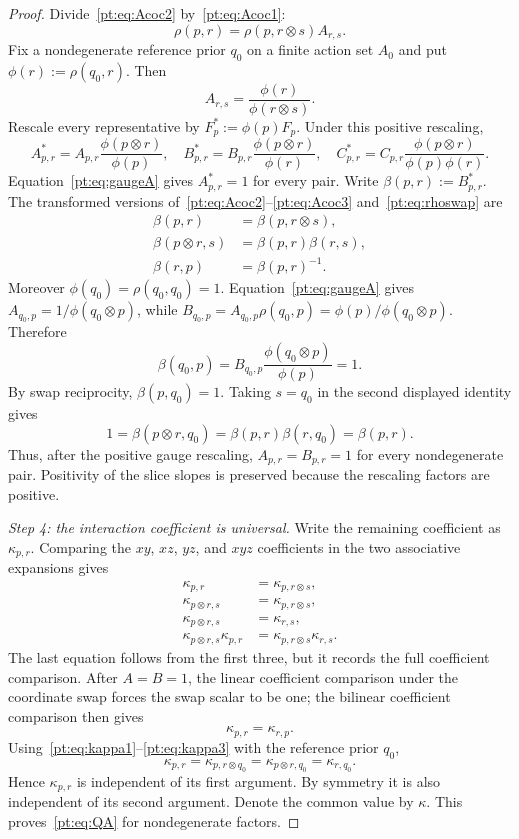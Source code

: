 \documentclass[11pt,a4paper]{article}
\theoremstyle{definition}
\newcommand{\1}{\mathbf 1}
\begin{document}
\begin{proof}
Divide~\eqref{pt:eq:Acoc2} by~\eqref{pt:eq:Acoc1}:
\[
\rho(p,r)=\rho(p,r\otimes s)A_{r,s}.
\]
Fix a nondegenerate reference prior $q_0$ on a finite action set $A_0$ and put $\phi(r):=\rho(q_0,r)$.  Then
\begin{equation}
A_{r,s}=\frac{\phi(r)}{\phi(r\otimes s)}.
\tag{G}\label{pt:eq:gaugeA}
\end{equation}
Rescale every representative by $F_p^*:=\phi(p)F_p$.  Under this positive rescaling,
\[
A^*_{p,r}=A_{p,r}\frac{\phi(p\otimes r)}{\phi(p)},
\quad
B^*_{p,r}=B_{p,r}\frac{\phi(p\otimes r)}{\phi(r)},
\quad
C^*_{p,r}=C_{p,r}\frac{\phi(p\otimes r)}{\phi(p)\phi(r)}.
\]
Equation~\eqref{pt:eq:gaugeA} gives $A^*_{p,r}=1$ for every pair.  Write $\beta(p,r):=B^*_{p,r}$.  The transformed
versions of~\eqref{pt:eq:Acoc2}--\eqref{pt:eq:Acoc3} and~\eqref{pt:eq:rhoswap} are
\begin{align*}
\beta(p,r)&=\beta(p,r\otimes s),\\
\beta(p\otimes r,s)&=\beta(p,r)\beta(r,s),\\
\beta(r,p)&=\beta(p,r)^{-1}.
\end{align*}
Moreover $\phi(q_0)=\rho(q_0,q_0)=1$.  Equation~\eqref{pt:eq:gaugeA} gives
$A_{q_0,p}=1/\phi(q_0\otimes p)$, while
$B_{q_0,p}=A_{q_0,p}\rho(q_0,p)=\phi(p)/\phi(q_0\otimes p)$.  Therefore
\[
\beta(q_0,p)=B_{q_0,p}\frac{\phi(q_0\otimes p)}{\phi(p)}=1.
\]
By swap reciprocity, $\beta(p,q_0)=1$.  Taking $s=q_0$ in the second displayed identity gives
\[
1=\beta(p\otimes r,q_0)=\beta(p,r)\beta(r,q_0)=\beta(p,r).
\]
Thus, after the positive gauge rescaling, $A_{p,r}=B_{p,r}=1$ for every nondegenerate pair.  Positivity of the slice
slopes is preserved because the rescaling factors are positive.

\emph{Step 4: the interaction coefficient is universal.}
Write the remaining coefficient as $\kappa_{p,r}$.  Comparing the $xy$, $xz$, $yz$, and $xyz$ coefficients in the two
associative expansions gives
\begin{align}
\kappa_{p,r}&=\kappa_{p,r\otimes s}, \tag{K1}\label{pt:eq:kappa1}\\
\kappa_{p\otimes r,s}&=\kappa_{p,r\otimes s}, \tag{K2}\label{pt:eq:kappa2}\\
\kappa_{p\otimes r,s}&=\kappa_{r,s}, \tag{K3}\label{pt:eq:kappa3}\\
\kappa_{p\otimes r,s}\kappa_{p,r}&=\kappa_{p,r\otimes s}\kappa_{r,s}. \tag{K4}\label{pt:eq:kappa4}
\end{align}
The last equation follows from the first three, but it records the full coefficient comparison.  After $A=B=1$, the
linear coefficient comparison under the coordinate swap forces the swap scalar to be one; the bilinear coefficient
comparison then gives
\begin{equation}
\kappa_{p,r}=\kappa_{r,p}.
\tag{KS}\label{pt:eq:kappasym}
\end{equation}
Using~\eqref{pt:eq:kappa1}--\eqref{pt:eq:kappa3} with the reference prior $q_0$,
\[
\kappa_{p,r}
=\kappa_{p,r\otimes q_0}
=\kappa_{p\otimes r,q_0}
=\kappa_{r,q_0}.
\]
Hence $\kappa_{p,r}$ is independent of its first argument.  By symmetry it is also independent of its second argument.
Denote the common value by $\kappa$.  This proves~\eqref{pt:eq:QA} for nondegenerate factors.


\end{proof}
\end{document}
